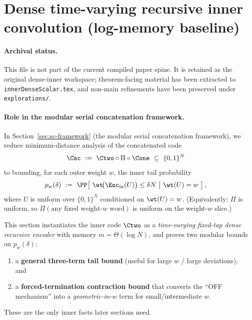 
\section{Dense time-varying recursive inner convolution (log-memory baseline)}
\label{sec:inner-dense}

\paragraph{Archival status.}
This file is not part of the current compiled paper spine. It is retained as
the original dense-inner workspace; theorem-facing material has been extracted
to \texttt{innerDenseScalar.tex}, and non-main refinements have been preserved
under \texttt{explorations/}.

\paragraph{Role in the modular serial concatenation framework.}
In Section~\ref{sec:sc-framework} (the modular serial concatenation framework),
we reduce minimum-distance analysis of the concatenated code
\[
\Csc \ :=\ \Ctwo \circ \Pi \circ \Cone \ \subseteq\ \{0,1\}^N
\]
to bounding, for each outer weight $w$, the inner tail probability
\[
p_w(\delta)\ :=\ 
\PP\!\left[\ \wt\!\big(\Enc_{\mathrm{in}}(U)\big)\le \delta N \ \middle|\ \wt(U)=w\ \right],
\]
where $U$ is uniform over $\{0,1\}^N$ conditioned on $\wt(U)=w$.
(Equivalently: $\Pi$ is uniform, so $\Pi(\text{any fixed weight-}w\text{ word})$ is uniform on the weight-$w$ slice.)

This section instantiates the inner code $\Ctwo$ as a \emph{time-varying fixed-tap dense recursive
encoder} with memory $m=\Theta(\log N)$, and proves two modular bounds on $p_w(\delta)$:
\begin{enumerate}
\item a \textbf{general three-term tail bound} (useful for large $w$ / large deviations), and
\item a \textbf{forced-termination contraction bound} that converts the ``OFF mechanism'' into a \emph{geometric-in-$w$}
term for small/intermediate $w$.
\end{enumerate}
These are the only inner facts later sections need.

